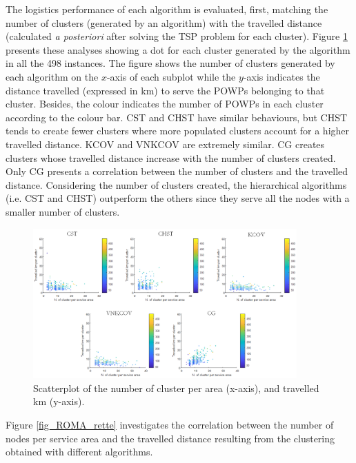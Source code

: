 The logistics performance of each algorithm is evaluated, first, matching the number of clusters (generated by an algorithm)  with the travelled distance (calculated \textit{a posteriori} after solving the TSP problem for each cluster). Figure \ref{fig_ROMA_bolle} presents these analyses showing a dot for each cluster generated by the algorithm in all the 498 instances. The figure shows the number of clusters generated by each algorithm on the $x$-axis of each subplot while the $y$-axis indicates the distance travelled (expressed in km) to serve the POWPs belonging to that cluster. Besides, the colour indicates the number of POWPs in each cluster according to the colour bar. CST and CHST have similar behaviours, but CHST tends to create fewer clusters where more populated clusters account for a higher travelled distance. KCOV and VNKCOV are extremely similar. CG creates clusters whose travelled distance increase with the number of clusters created. Only CG presents a correlation between the number of clusters and the travelled distance. Considering the number of clusters created, the hierarchical algorithms (i.e. CST and CHST) outperform the others since they serve all the nodes with a smaller number of clusters.

\begin{figure}[hbt!]
\centering
\includegraphics[width=0.9\textwidth]{SectionDistribution/design_figures/fig_ROMA_bolle.png}
\captionsetup{type=figure}
\caption{Scatterplot of the number of cluster per area (x-axis), and travelled km (y-axis).}
\label{fig_ROMA_bolle}
\end{figure}

Figure \ref{fig_ROMA_rette} investigates the correlation between the number of nodes per service area and the travelled distance resulting from the clustering obtained with different algorithms. 

